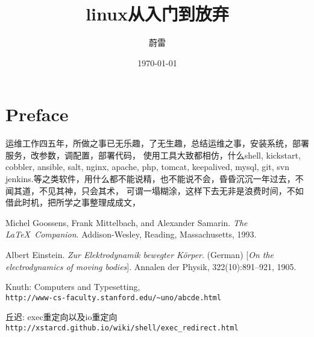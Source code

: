 \documentclass[11pt,a4paper]{book}
\title{linux从入门到放弃}
\author{蔚雷}
\date{\today}
\begin{document}
\maketitle

\tableofcontents 

\mainmatter

\chapter*{Preface}

运维工作四五年，所做之事已无乐趣，了无生趣，总结运维之事，安装系统，部署服务，改参数，调配置，部署代码，
使用工具大致都相仿，什么shell, kickstart, cobbler, ansible, salt, nginx, apache, php, tomcat, keepalived, mysql, git, svn 
jenkins.等之类软件，用什么都不能说精，也不能说不会，昏昏沉沉一年过去，不闻其道，不见其神，只会其术，
可谓一塌糊涂，这样下去无非是浪费时间，不如借此时机，把所学之事整理成成文，







%

\begin{thebibliography}{9}
Michel Goossens, Frank Mittelbach, and Alexander Samarin. 
\textit{The \LaTeX\ Companion}. 
Addison-Wesley, Reading, Massachusetts, 1993.
 
Albert Einstein. 
\textit{Zur Elektrodynamik bewegter K{\"o}rper}. (German) 
[\textit{On the electrodynamics of moving bodies}]. 
Annalen der Physik, 322(10):891–921, 1905.
 
Knuth: Computers and Typesetting,
\\\texttt{http://www-cs-faculty.stanford.edu/\~{}uno/abcde.html}

	丘迟: exec重定向以及io重定向
	\\\texttt{http://xstarcd.github.io/wiki/shell/exec_redirect.html}

\end{thebibliography}
\end{document}
